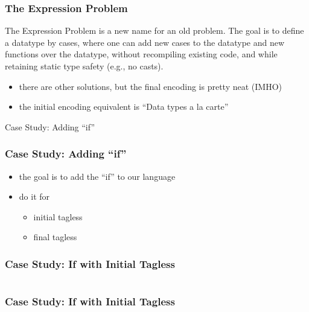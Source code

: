 \documentclass[aspectratio=169, hyperref={colorlinks, linkcolor=beamer@centricgreen}, urlcolor=links]{beamer}
\begin{document}
\begin{frame}
  \frametitle{The Expression Problem}
  \begin{tcolorbox}[
    fonttitle=\sffamily\bfseries,
    colbacktitle=black,
    colframe=black,
    coltitle=beamer@centricgreen,
    title=Philip Wadler on 12. November 1998
    ]
    The Expression Problem is a new name for an old problem.  The goal
    is to define a datatype by cases, where one can add new cases to
    the datatype and new functions over the datatype, without
    recompiling existing code, and while retaining static type safety
    (e.g., no casts).
  \end{tcolorbox}
  \begin{itemize}
  \item there are other solutions, but the final encoding is
    pretty neat (IMHO)
  \item the initial encoding equivalent is ``Data types a la carte''
  \end{itemize}
\end{frame}

\begin{frame}
  \begin{center}
    \Huge
    Case Study: Adding ``if''
  \end{center}
\end{frame}

\begin{frame}
  \frametitle{Case Study: Adding ``if''}
  \begin{itemize}
  \item the goal is to add the ``if'' to our language
  \item do it for
    \begin{itemize}
    \item initial tagless
    \item final tagless
    \end{itemize}
  \end{itemize}
\end{frame}

\begin{frame}[fragile]
  \frametitle{Case Study: If with Initial Tagless}
  \inputminted[fontsize=\footnotesize]{scala}{snippets/initial-tagless-expr-if.scala}
\end{frame}

\begin{frame}[fragile]
  \frametitle{Case Study: If with Initial Tagless}
  \inputminted[fontsize=\footnotesize]{scala}{snippets/initial-tagless-sample-if.scala}
\end{frame}
\end{document}
